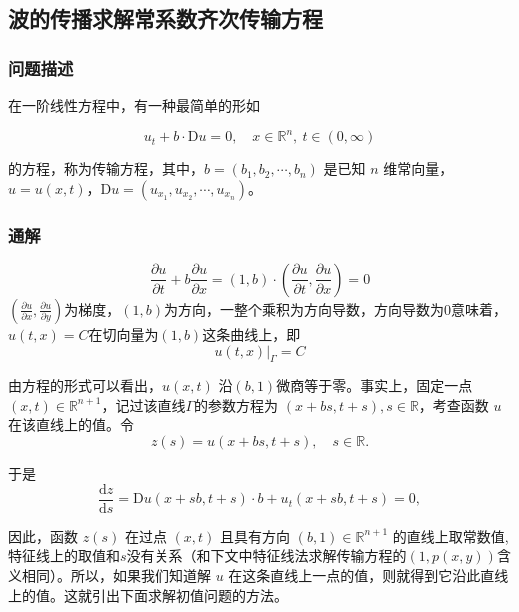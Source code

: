 \documentclass[12pt,a4paper]{article}
\numberwithin{subsection}{section}
\numberwithin{subsubsection}{subsection}
\theoremstyle{plain}
\theoremstyle{definition}
\theoremstyle{remark}
\begin{document}
	
	\subsection{波的传播求解常系数齐次传输方程} 
	\subsubsection{问题描述}
	在一阶线性方程中，有一种最简单的形如
	
	\begin{equation}
		u_t + b \cdot \mathrm{D}u = 0, \quad x \in \mathbb{R}^n, \ t \in (0, \infty)
	\end{equation}
	
	的方程，称为传输方程，其中，\(b = (b_1, b_2, \cdots, b_n)\) 是已知 \(n\) 维常向量，\(u = u(x, t)\)，\(\mathrm{D}u = (u_{x_1}, u_{x_2}, \cdots, u_{x_n})\)。
	
		\subsubsection{通解} 
			\begin{equation}
			\frac{\partial u}{\partial t} + b \frac{\partial u}{\partial x}=(1, b) \cdot \left( \frac{\partial u}{\partial t}, \frac{\partial u}{\partial x} \right) = 0 
		\end{equation}
		$\left( \frac{\partial u}{\partial x}, \frac{\partial u}{\partial y} \right)$为梯度，$(1, b)$为方向，一整个乘积为方向导数，方向导数为0意味着，$u(t, x)=C$在切向量为$(1, b)$这条曲线上，即
		\begin{equation}
			u(t,x)|_{\Gamma} = C
		\end{equation}
		
	
	由方程的形式可以看出，\(u(x, t)\) 沿$(b, 1)$微商等于零。事实上，固定一点 \((x, t) \in \mathbb{R}^{n+1}\)，记过该直线$\Gamma$的参数方程为 \((x + bs, t + s), s \in \mathbb{R}\)，考查函数 \(u\) 在该直线上的值。令
\begin{equation}
	z(s) = u(x + bs, t + s), \quad s \in \mathbb{R}.
	\end{equation}
	
	于是
	\begin{equation}
	\frac{\mathrm{d}z}{\mathrm{d}s} = \mathrm{D}u(x + sb, t + s) \cdot b + u_t(x + sb, t + s) = 0,
	\end{equation}
	
	因此，函数 \(z(s)\) 在过点 \((x, t)\) 且具有方向 \((b, 1) \in \mathbb{R}^{n+1}\) 的直线上取常数值,特征线上的取值和$s$没有关系（和下文中特征线法求解传输方程的$(1, p(x, y))$含义相同）。所以，如果我们知道解 \(u\) 在这条直线上一点的值，则就得到它沿此直线上的值。这就引出下面求解初值问题的方法。
	
\end{document}
